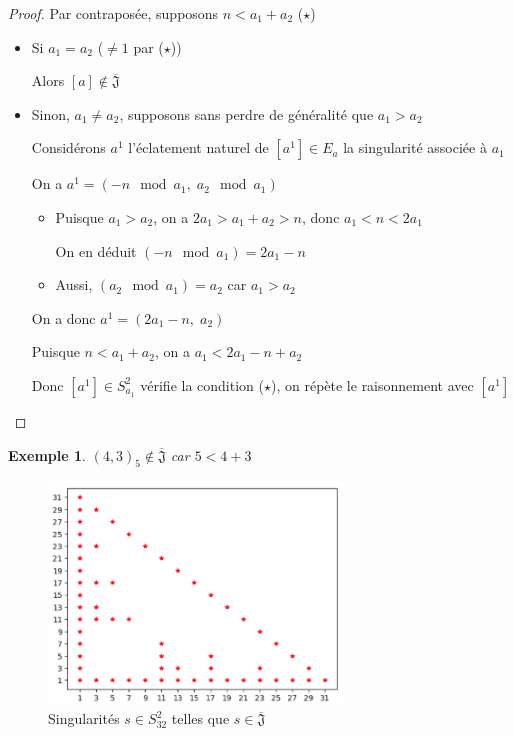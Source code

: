 \documentclass{article}
\newtheorem{example}{Exemple}
\newcommand{\J}{\mathfrak{J}}
\newcommand{\JS}{\overline{\J}}
\begin{document}
\begin{proof}
    Par contraposée, supposons $n < a_1 + a_2$ ($\star$)

    \begin{itemize}
        \item Si $a_1 = a_2$ ($\neq 1$ par ($\star$))

            Alors $[a] \not \in \JS$
        \item Sinon, $a_1 \neq a_2$, supposons sans perdre de généralité que $a_1 > a_2$

            Considérons $a^1$ l'éclatement naturel de $[a^1] \in E_a$ la singularité associée à $a_1$

            On a $a^1 = (-n \mod a_1,\; a_2 \mod a_1)$

            \begin{itemize}
                \item Puisque $a_1 > a_2$, on a $2a_1 > a_1 + a_2 > n$, donc $a_1 < n < 2a_1$
                    
                On en déduit $(-n \mod a_1) = 2a_1 - n$

                \item Aussi, $(a_2 \mod a_1) = a_2$ car $a_1 > a_2$
            \end{itemize}

            On a donc $a^1 = (2a_1-n,\; a_2)$

            Puisque $n < a_1 + a_2$, on a $a_1 < 2a_1 - n + a_2$

            Donc $[a^1] \in S_{a_1}^2$ vérifie la condition ($\star$), on répète le raisonnement avec $[a^1]$
    \end{itemize}
\end{proof}

\begin{example}
    ${(4, 3)}_5 \not \in \JS$ car $5 < 4 + 3$
\end{example}

\begin{figure}[h]
    \caption{Singularités $s \in S_{32}^2$ telles que $s \in \JS$}
    \centering
    \includegraphics[width=0.7\textwidth]{singularite_j_strict_m2_n32}
\end{figure}
\end{document}
